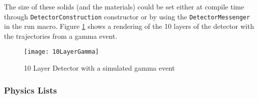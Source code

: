 The size of these solids (and the materials) could be set either at compile time through \verb+DetectorConstruction+ constructor or by using the \verb+DetectorMessenger+ in the run macro.
Figure \ref{fig:LayerDetectorGeo} shows a rendering of the 10 layers of the detector with the trajectories from a gamma event.

\begin{figure}[h] 
    \texttt{[image: 10LayerGamma]}
	\caption{10 Layer Detector with a simulated gamma event}
    \label{fig:LayerDetectorGeo}
\end{figure}

\subsubsection{Physics Lists}

